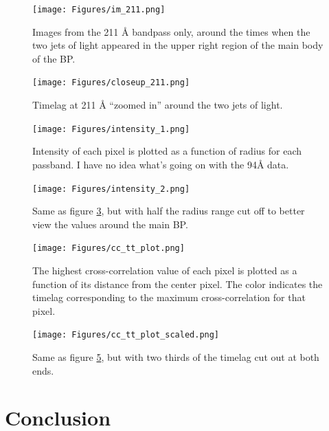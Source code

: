 \documentclass[preprint2]{aastex}
\begin{document}
\begin{figure}[htb!]
    \texttt{[image: Figures/im\_211.png]}
    \caption{Images from the 211 \AA{} bandpass only, around the times when the
        two jets of light appeared in the upper right region of the main body of the BP. }
    \label{211_images}
\end{figure}

\begin{figure}[htb!]
    \texttt{[image: Figures/closeup\_211.png]}
    \caption{Timelag at 211 \AA{} ``zoomed in'' around the two jets of light.}
    \label{closeup}
\end{figure}

\begin{figure}[htb!]
    \texttt{[image: Figures/intensity\_1.png]}
    \caption{Intensity of each pixel is plotted as a function of radius for each
        passband. I have no idea what's going on with the 94\AA{} data.}
    \label{intensity_1}
\end{figure}

\begin{figure}[htb!]
    \texttt{[image: Figures/intensity\_2.png]}
    \caption{Same as figure \ref{intensity_1}, but with half the radius range
        cut off to better view the values around the main BP.}
    \label{intensity_2}
\end{figure}

\begin{figure}[htb!]
    \texttt{[image: Figures/cc\_tt\_plot.png]}
    \caption{The highest cross-correlation value of each pixel is plotted as a function
        of its distance from the center pixel. The color indicates the timelag
        corresponding to the maximum cross-correlation for that pixel.}
    \label{tt_all_plot}
\end{figure}

\begin{figure}[htb!]
    \texttt{[image: Figures/cc\_tt\_plot\_scaled.png]}
    \caption{Same as figure \ref{tt_all_plot}, but with two thirds of the timelag cut out
        at both ends.}
    \label{tt_plot}
\end{figure}


\section{Conclusion}\label{conclusion}


\end{document}
